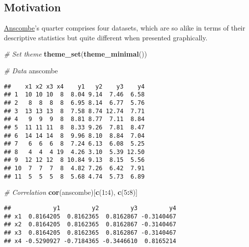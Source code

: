 \documentclass[
]{book}
\newenvironment{Shaded}{\begin{snugshade}}{\end{snugshade}}
\newcommand{\CommentTok}[1]{\textcolor[rgb]{0.56,0.35,0.01}{\textit{#1}}}
\newcommand{\DecValTok}[1]{\textcolor[rgb]{0.00,0.00,0.81}{#1}}
\newcommand{\KeywordTok}[1]{\textcolor[rgb]{0.13,0.29,0.53}{\textbf{#1}}}
\newcommand{\NormalTok}[1]{#1}
\newcommand{\OperatorTok}[1]{\textcolor[rgb]{0.81,0.36,0.00}{\textbf{#1}}}
\begin{document}
\hypertarget{motivation-2}{%
\subsection{Motivation}\label{motivation-2}}

\href{https://en.wikipedia.org/wiki/Frank_Anscombe}{Anscombe}'s quarter comprises four datasets, which are so alike in terms of their descriptive statistics but quite different when presented graphically.

\begin{Shaded}
\begin{Highlighting}[]
\CommentTok{\# Set theme}
\KeywordTok{theme\_set}\NormalTok{(}\KeywordTok{theme\_minimal}\NormalTok{())}
\end{Highlighting}
\end{Shaded}

\begin{Shaded}
\begin{Highlighting}[]
\CommentTok{\# Data}
\NormalTok{anscombe}
\end{Highlighting}
\end{Shaded}

\begin{verbatim}
##    x1 x2 x3 x4    y1   y2    y3    y4
## 1  10 10 10  8  8.04 9.14  7.46  6.58
## 2   8  8  8  8  6.95 8.14  6.77  5.76
## 3  13 13 13  8  7.58 8.74 12.74  7.71
## 4   9  9  9  8  8.81 8.77  7.11  8.84
## 5  11 11 11  8  8.33 9.26  7.81  8.47
## 6  14 14 14  8  9.96 8.10  8.84  7.04
## 7   6  6  6  8  7.24 6.13  6.08  5.25
## 8   4  4  4 19  4.26 3.10  5.39 12.50
## 9  12 12 12  8 10.84 9.13  8.15  5.56
## 10  7  7  7  8  4.82 7.26  6.42  7.91
## 11  5  5  5  8  5.68 4.74  5.73  6.89
\end{verbatim}

\begin{Shaded}
\begin{Highlighting}[]
\CommentTok{\# Correlation}
\KeywordTok{cor}\NormalTok{(anscombe)[}\KeywordTok{c}\NormalTok{(}\DecValTok{1}\OperatorTok{:}\DecValTok{4}\NormalTok{), }\KeywordTok{c}\NormalTok{(}\DecValTok{5}\OperatorTok{:}\DecValTok{8}\NormalTok{)]}
\end{Highlighting}
\end{Shaded}

\begin{verbatim}
##            y1         y2         y3         y4
## x1  0.8164205  0.8162365  0.8162867 -0.3140467
## x2  0.8164205  0.8162365  0.8162867 -0.3140467
## x3  0.8164205  0.8162365  0.8162867 -0.3140467
## x4 -0.5290927 -0.7184365 -0.3446610  0.8165214
\end{verbatim}
\end{document}
